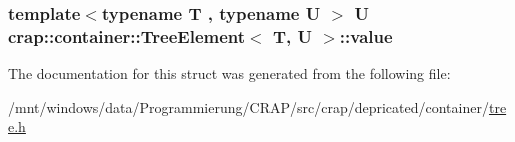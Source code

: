 \hypertarget{structcrap_1_1container_1_1_tree_element_ab85c021334d56f436f982126190e89af}{
\subsubsection[{value}]{\setlength{\rightskip}{0pt plus 5cm}template$<$typename T , typename U $>$ U {\bf crap\-::container\-::\-Tree\-Element}$<$ T, U $>$\-::value}}\label{structcrap_1_1container_1_1_tree_element_ab85c021334d56f436f982126190e89af}


The documentation for this struct was generated from the following file\-:\begin{DoxyCompactItemize}
\item 
/mnt/windows/data/\-Programmierung/\-C\-R\-A\-P/src/crap/depricated/container/\hyperlink{tree_8h}{tree.\-h}\end{DoxyCompactItemize}
